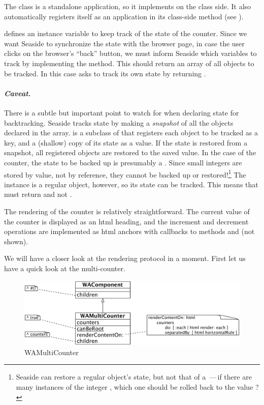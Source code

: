\documentclass[a4paper,10pt,twoside]{book}
\begin{document}
The class  is a standalone application, so it implements  on the class side.
It also automatically registers itself as an application in its class-side  method (see ).

 defines an instance variable  to keep track of the state of the counter.
Since we want Seaside to synchronize the state with the browser page, \ie in case the user clicks on the browser's ``back'' button, we must inform Seaside which variables to track by implementing the  method.
This should return an array of all objects to be tracked.
In this case  asks to track its own state by returning .

\paragraph{\emph{Caveat.}}
There is a subtle but important point to watch for when declaring state for backtracking.
Seaside tracks state by making a \emph{snapshot} of all the objects declared in the  array.
 is a subclass of  that registers each object to be tracked as a key, and a (shallow) copy of its state as a value.
If the state is restored from a snapshot, all registered objects are restored to the saved value.
In the case of the counter, the state to be backed up is presumably a .
Since small integers are stored by value, not by reference, they cannot be backed up or restored!\footnote{Seaside can restore a regular object's state, but not that of a \,---\,if there are many instances of the integer , which one should be rolled back to the value ?}
The  instance is a regular object, however, so its state can be tracked.
This means that  must return  and not .

The rendering of the counter is relatively straightforward.
The current value of the counter is displayed as an html heading, and the increment and decrement operations are implemented as html anchors with callbacks to methods  and  (not shown).

We will have a closer look at the rendering protocol in a moment.
First let us have a quick look at the multi-counter.

\begin{figure}[ht]
\begin{center}
\includegraphics[width=\textwidth]{WAMultiCounter}
\caption{WAMultiCounter}
\label{fig:WAMultiCounter}
\end{center}
\end{figure}
\end{document}
